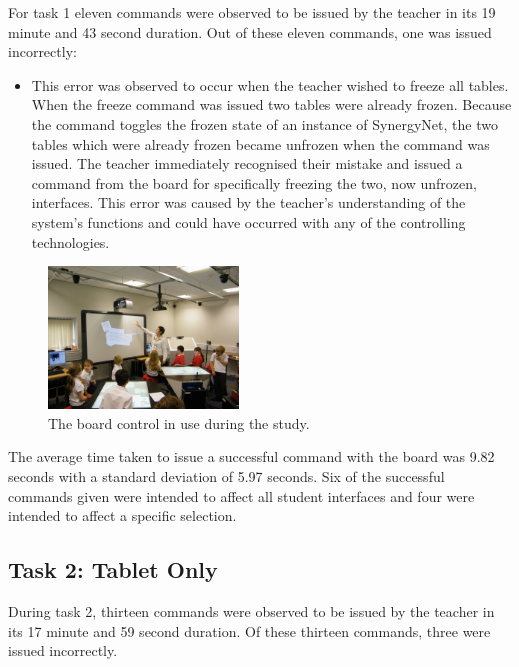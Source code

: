 \documentclass[link]{IWCOMP}
\begin{document}
For task 1 eleven commands were observed to be issued by the teacher in its 19 minute and 43 second duration.
Out of these eleven commands, one was issued incorrectly:

\begin{itemize}
\item This error was observed to occur when the teacher wished to freeze all tables.
When the freeze command was issued two tables were already frozen.
Because the command toggles the frozen state of an instance of SynergyNet, the two tables which were already frozen became unfrozen when the command was issued.
The teacher immediately recognised their mistake and issued a command from the board for specifically freezing the two, now unfrozen, interfaces.
This error was caused by the teacher's understanding of the system's functions and could have occurred with any of the controlling technologies.
\end{itemize}

\begin{figure}[h]
   \centering
   \includegraphics[width=0.45\textwidth]{figures/new_study_board.png}
   \caption{The board control in use during the study.}
   \label{fig:studyBoard}
\end{figure}

The average time taken to issue a successful command with the board was 9.82 seconds with a standard deviation of 5.97 seconds.
Six of the successful commands given were intended to affect all student interfaces and four were intended to affect a specific selection.

\subsection{Task 2: Tablet Only}
\label{subsec:resultsTask2}

During task 2, thirteen commands were observed to be issued by the teacher in its 17 minute and 59 second duration.
Of these thirteen commands, three were issued incorrectly.
\end{document}
